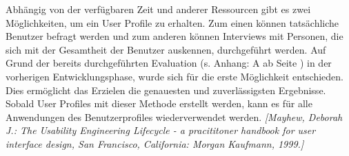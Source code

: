\documentclass[a4paper,11pt]{article}%
\renewcommand{\\}{\vspace*{0.5\baselineskip} \newline}
\begin{document}
	Abhängig von der verfügbaren Zeit und anderer Ressourcen gibt es zwei Möglichkeiten, um ein User Profile zu erhalten. Zum einen können tatsächliche Benutzer befragt werden und zum anderen können Interviews mit Personen, die sich mit der Gesamtheit der Benutzer auskennen, durchgeführt werden. Auf Grund der bereits durchgeführten Evaluation (s. Anhang: A  ab Seite \pageref{section:Evaluation}) in der vorherigen Entwicklungsphase, wurde sich für die erste Möglichkeit entschieden. Dies ermöglicht das Erzielen die genauesten und zuverlässigsten Ergebnisse. Sobald User Profiles mit dieser Methode erstellt werden, kann es für alle Anwendungen des Benutzerprofiles wiederverwendet werden. \emph{[Mayhew, Deborah J.:	The Usability Engineering Lifecycle - a pracititoner handbook for user interface design, San Francisco, California: Morgan Kaufmann, 1999.]}
\end{document}
